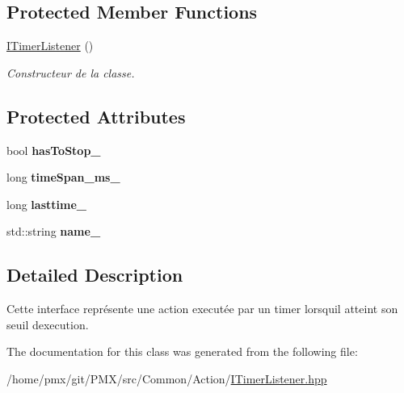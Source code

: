 \subsection*{Protected Member Functions}
\begin{DoxyCompactItemize}
\item 
\mbox{\label{classITimerListener_a2099c9b93c841f05c5e99449943d4e98}} 
\hyperlink{classITimerListener_a2099c9b93c841f05c5e99449943d4e98}{I\+Timer\+Listener} ()
\begin{DoxyCompactList}\small\item\em Constructeur de la classe. \end{DoxyCompactList}\end{DoxyCompactItemize}
\subsection*{Protected Attributes}
\begin{DoxyCompactItemize}
\item 
\mbox{\label{classITimerListener_a4557b2d0a2dae7ac879ba196afa7b9f3}} 
bool {\bfseries has\+To\+Stop\+\_\+}
\item 
\mbox{\label{classITimerListener_a79a8f5efb2fbba8bdc896a808e1eea5b}} 
long {\bfseries time\+Span\+\_\+ms\+\_\+}
\item 
\mbox{\label{classITimerListener_a9e909d3833770c23c16031c47babf846}} 
long {\bfseries lasttime\+\_\+}
\item 
\mbox{\label{classITimerListener_a5cd3eba68cf1e8c8ca99732cb2c607d0}} 
std\+::string {\bfseries name\+\_\+}
\end{DoxyCompactItemize}


\subsection{Detailed Description}
Cette interface représente une action executée par un timer lorsqu\textquotesingle{}il atteint son seuil d\textquotesingle{}execution. 

The documentation for this class was generated from the following file\+:\begin{DoxyCompactItemize}
\item 
/home/pmx/git/\+P\+M\+X/src/\+Common/\+Action/\hyperlink{ITimerListener_8hpp}{I\+Timer\+Listener.\+hpp}\end{DoxyCompactItemize}
